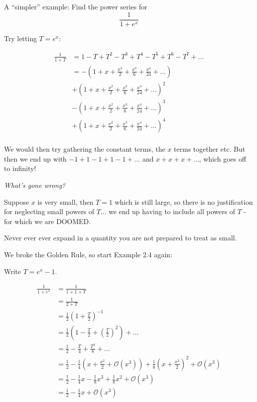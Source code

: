 \documentclass[twoside]{scrartcl}
\begin{document}
\begin{example} A ``simpler'' example: Find the power series for 
\[\frac{1}{1 + e^x}\]

Try letting $T = e^x$: 

\[
\begin{aligned}
  \frac{1}{1 + T} &= 1 - T + T^2 - T^3 + T^4 - T^5 + T^6 - T^7 + \dots\\
  &= -(1 + x + \frac{x^2}{2} + \frac{x^3}{6} + \frac{x^4}{24} + \dots)\\
  &+ (1 + x + \frac{x^2}{2} + \frac{x^3}{6} + \frac{x^4}{24} + \dots)^2\\
  &- (1 + x + \frac{x^2}{2} + \frac{x^3}{6} + \frac{x^4}{24} + \dots)^3\\
  &+ (1 + x + \frac{x^2}{2} + \frac{x^3}{6} + \frac{x^4}{24} + \dots)^4\\
\end{aligned}
\]

We would then try gathering the constant terms, the $x$ terms together etc. But then we end up with $-1 + 1 -1 + 1 - 1 + \dots$ and $x + x + x + \dots$, which goes off to infinity! 

\emph{What's gone wrong?}

 Suppose $x$ is very small, then $T = 1$ which is still large, so there is no justification for neglecting small powers of $T$... we end up having to include all powers of $T$ - for which we are DOOMED. 
 \end{example}

\begin{theorem}
	Never ever ever expand in a quantity you are not prepared to treat as small. 
\end{theorem}\vspace*{10pt}


\begin{example}
 We broke the Golden Rule, so start Example 2.4 again: 

Write $T = e^x - 1$.

\[
\begin{aligned}
  \frac{1}{1 +e^x} &= \frac{1}{1 + 1 + T}\\
  &= \frac{1}{2 + T}\\
  &= \frac{1}{2}\left(1 + \frac{T}{2}\right)^{-1}\\
  &= \frac{1}{2}\left( 1 -\frac{T}{2} + \left(\frac{T}{2}\right)^2\right) + \dots \\
  &= \frac{1}{2} - \frac{T}{4} + \frac{T^2}{8} + \dots\\
  &= \frac{1}{2} - \frac{1}{4}\left( x + \frac{x^2}{2} + \mathcal{O}(x^3)\right) + \frac{1}{8}\left(x + \frac{x^2}{2}\right)^2 + \mathcal{O}(x^3)\\
  &= \frac{1}{2} - \frac{1}{4}x - \frac{1}{8}x^3 + \frac{1}{8}x^2 + \mathcal{O}(x^3)\\
  &= \frac{1}{2} -\frac{1}{4}x + \mathcal{O}(x^3)
\end{aligned}
\]
 
 	
\end{example}
\end{document}
